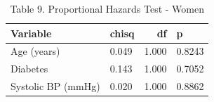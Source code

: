 \begin{table}[ht]
\centering
\caption{Table 9. Proportional Hazards Test - Women} 
\begin{tabular}{llrl}
  \toprule
Variable & chisq & df & p \\ 
  \midrule
Age (years) & 0.049 & 1.000 & 0.8243 \\ 
  Diabetes & 0.143 & 1.000 & 0.7052 \\ 
  Systolic BP (mmHg) & 0.020 & 1.000 & 0.8862 \\ 
   \bottomrule
\end{tabular}
\end{table}
